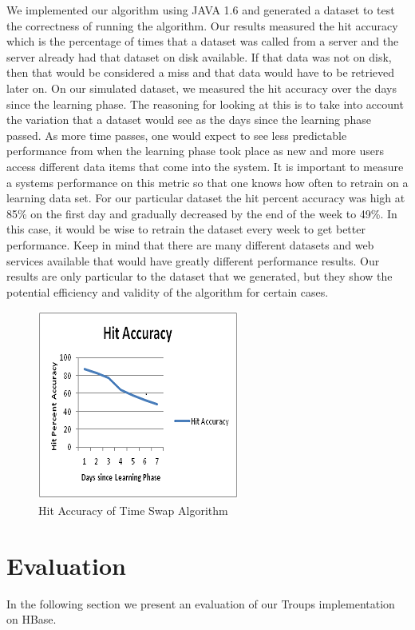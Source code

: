 \documentclass[10pt,final,journal]{IEEEtran}
\begin{document}
We implemented our algorithm using JAVA 1.6 and generated a dataset to test the correctness of running the algorithm. Our results measured the hit accuracy which is the percentage of times that a dataset was called from a server and the server already had that dataset on disk available. If that data was not on disk, then that would be considered a miss and that data would have to be retrieved later on. On our simulated dataset, we measured the hit accuracy over the days since the learning phase. The reasoning for looking at this is to take into account the variation that a dataset would see as the days since the learning phase passed. As more time passes, one would expect to see less predictable performance from when the learning phase took place as new and more users access different data items that come into the system. It is important to measure a systems performance on this metric so that one knows how often to retrain on a learning data set. For our particular dataset the hit percent accuracy was high at 85\% on the first day and gradually decreased by the end of the week to 49\%. In this case, it would be wise to retrain the dataset every week to get better performance. Keep in mind that there are many different datasets and web services available that would have greatly different performance results. Our results are only particular to the dataset that we generated, but they show the potential efficiency and validity of the algorithm for certain cases.

\begin{figure}[!t]
\centering
\hspace*{-.2in}
\includegraphics{images/hitaccuracy.png}
\caption{Hit Accuracy of Time Swap Algorithm}
\label{ts}
\end{figure}

\section{Evaluation}
In the following section we present an evaluation of our Troups implementation on HBase.
\end{document}
